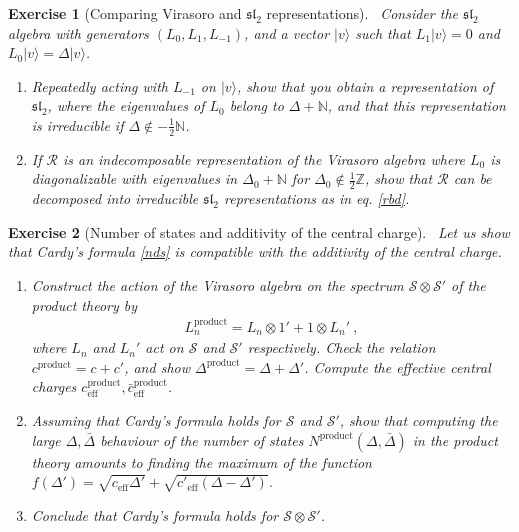\documentclass[12pt, a4paper, notitlepage, twoside]{report}
\numberwithin{equation}{section}
\theoremstyle{break}
\newtheorem{exo}{Exercise}[chapter]
\begin{document}
\begin{exo}[Comparing Virasoro and $\mathfrak{sl}_2$ representations]
 ~\label{exodis}
Consider the $\mathfrak{sl}_2$ algebra with generators $(L_0,L_1,L_{-1})$, and a vector $|v\rangle$ such that $L_1|v\rangle = 0 $ and $L_0|v\rangle = \Delta |v\rangle$.
\begin{enumerate}
 \item 
Repeatedly acting with $L_{-1}$ on $|v\rangle$, show that you obtain a representation of $\mathfrak{sl}_2$, where the eigenvalues of $L_0$ belong to $\Delta+{\mathbb{N}}$, and that this representation is irreducible if $\Delta\notin -\frac12 \mathbb{N}$.
\item
If $\mathcal{R}$ is an indecomposable representation of the Virasoro algebra where $L_0$ is diagonalizable with eigenvalues in $\Delta_0+\mathbb{N}$ for $\Delta_0\notin\frac12 \mathbb{Z}$, show that $\mathcal{R}$ can be decomposed into irreducible $\mathfrak{sl}_2$ representations as in eq. \eqref{rbd}.
\end{enumerate}
\end{exo}


\begin{exo}[Number of states and additivity of the central charge]
 ~\label{exoacf} 
Let us show that Cardy's formula \eqref{nds} is compatible with the additivity of the central charge.
\begin{enumerate}
 \item Construct the action of the Virasoro algebra on the spectrum $\mathcal{S}\otimes \mathcal{S}'$ of the product theory by 
\begin{align}
 L_n^\text{product} = L_n\otimes 1' + 1\otimes L_n'\ ,
\end{align}
where $L_n$ and $L_n'$ act on $\mathcal{S}$ and $\mathcal{S}'$ respectively.
Check the relation $c^\text{product} = c+c'$, and show $\Delta^\text{product} = \Delta+\Delta'$.
Compute the effective central charges $c^\text{product}_\text{eff}, \bar c^\text{product}_\text{eff}$.
\item 
Assuming that Cardy's formula holds for $\mathcal{S}$ and $\mathcal{S}'$, show that computing the large $\Delta,\bar\Delta$ behaviour of the number of states $N^\text{product}(\Delta,\bar\Delta)$ in the product theory amounts to finding the maximum of the function $f(\Delta') = \sqrt{c_\text{eff}\Delta'} +\sqrt{c'_\text{eff}(\Delta-\Delta')}$.
\item
Conclude that Cardy's formula holds for $\mathcal{S}\otimes \mathcal{S}'$.
\end{enumerate}
\end{exo}
\end{document}
